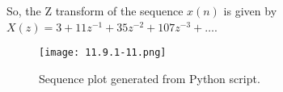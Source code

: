 \documentclass[12pt]{article}
\begin{document}
So, the Z transform of the sequence \(x(n)\) is given by \(X(z) = 3 + 11z^{-1} + 35z^{-2} + 107z^{-3} + \ldots\).

\begin{figure}[h]
    \centering
    \texttt{[image: 11.9.1-11.png]}
    \caption{Sequence plot generated from Python script.}
    \label{fig:sequence-plot}
\end{figure}
\end{document}
